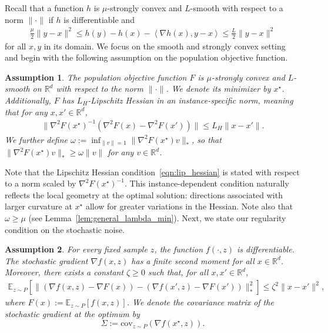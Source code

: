 \documentclass[11pt,twoside]{article}
\numberwithin{equation}{section}
\newcommand{\EE}{\mathbb{E}}
\newcommand{\RR}{\mathbb{R}}
\newcommand{\1}{\mathbf{1}}
\newcommand{\dotp}[1]{\left\langle #1\right\rangle}
\newtheorem{assumption}{Assumption}
\theoremstyle{remark}
\theoremstyle{plain}
\newcommand{\cov}{\mathrm{cov}}
\newcommand{\liph}{L_H}
\newcommand{\lmin}{\omega}
\begin{document}
Recall that a function $h$ is $\mu$-strongly convex and $L$-smooth with respect to a norm $\| \cdot \|$ if $h$ is differentiable and
\begin{align*}
	\frac{\mu}{2}\|y-x\|^2 \le h(y) - h(x) - \dotp{\nabla h(x), y-x} \le \frac{L}{2} \|y-x\|^2
\end{align*}
for all $x, y$ in its domain.
We focus on the smooth and strongly convex setting and begin with the following assumption on the population objective function.
\begin{assumption}\label{assum: non-quadratic}
	The population objective function $F$ is $\mu$-strongly convex and $L$-smooth on $\mathbb{R}^d$ with respect to the norm $\| \cdot \|$. We denote its minimizer by $x^\star$. Additionally, $F$ has $\liph$-Lipschitz Hessian in an instance-specific norm, meaning that for any $x, x' \in \RR^d$,
	\begin{align}\label{eqn:lip_hessian}
		\|\nabla^2 F(x^\star) ^{-1}(\nabla^2 F(x) - \nabla^2 F(x'))\| \le \liph \|x - x'\|.
	\end{align}
	We further define $\lmin := \inf_{\|v\| =1} \| \nabla^2 F(x^\star) v \|_*$, so  that $\|\nabla^2 F(x^\star) v\|_* \ge \lmin \|v\|$ for any $v \in \RR^d$.
\end{assumption}
Note that the Lipschitz Hessian condition~\eqref{eqn:lip_hessian} is stated with respect to a norm scaled by $\nabla^2 F(x^\star)^{-1}$. This instance-dependent condition naturally reflects the local geometry at the optimal solution: directions associated with larger curvature at $x^\star$ allow for greater variations in the Hessian. Note also that $\lmin \ge \mu$ (see Lemma~\ref{lem:general_lambda_min}). Next, we state our regularity condition on the stochastic noise. 
\begin{assumption}\label{assum:vr_assum}
	For every fixed sample $z$, the function $f(\cdot, z)$ is differentiable.  
	The stochastic gradient $\nabla f(x, z)$  has a finite second moment for all $x \in \RR^d$. Moreover, there exists a constant $\zeta \ge 0$ such that, for all $x, x' \in \RR^d$,
	\begin{align}\label{eqn:vr_assum}
		\EE_{z \sim P}\!\left[\big\|(\nabla f(x, z) - \nabla F(x)) - (\nabla f(x', z) - \nabla F(x'))\big\|_*^2\right]
		\le \zeta^2 \|x - x'\|^2,
	\end{align}
	where $F(x) := \EE_{z \sim P}[f(x, z)]$.  
	We denote the covariance matrix of the stochastic gradient at the optimum by
	\[
	\Sigma := \cov_{z \sim P}(\nabla f(x^\star, z)).
	\]
\end{assumption}
\end{document}
